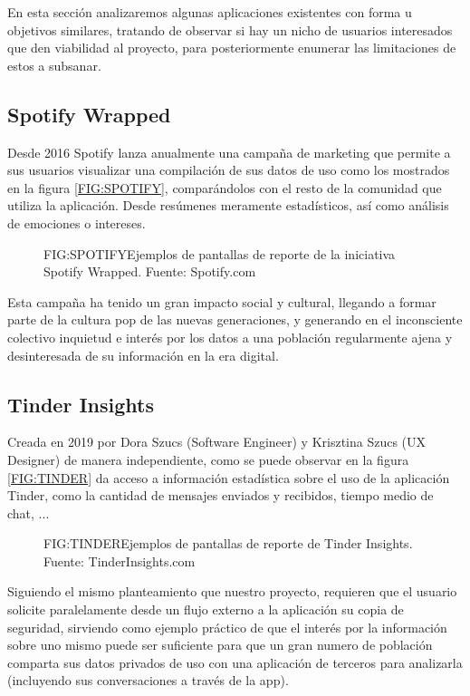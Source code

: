 
En esta sección analizaremos algunas aplicaciones existentes con forma u objetivos similares, tratando de observar si hay un nicho de usuarios interesados que den viabilidad al proyecto, para posteriormente enumerar las limitaciones de estos a subsanar.

\subsection{Spotify Wrapped}

Desde 2016 Spotify lanza anualmente una campaña de marketing\cite{SpotifyWrapped} que permite a sus usuarios visualizar una compilación de sus datos de uso como los mostrados en la figura \ref{FIG:SPOTIFY}, comparándolos con el resto de la comunidad que utiliza la aplicación. Desde resúmenes meramente estadísticos, así como análisis de emociones o intereses.

\begin{figure}[Spotify Wrapped]{FIG:SPOTIFY}{Ejemplos de pantallas de reporte de la iniciativa Spotify Wrapped. Fuente: Spotify.com}
\end{figure}

Esta campaña ha tenido un gran impacto social y cultural, llegando a formar parte de la cultura pop de las nuevas generaciones, y generando en el inconsciente colectivo inquietud e interés por los datos a una población regularmente ajena y desinteresada de su información en la era digital.

\newpage

\subsection{Tinder Insights}

Creada en 2019 por Dora Szucs (Software Engineer) y Krisztina Szucs (UX Designer) de manera independiente\cite{TinderInsigths}, como se puede observar en la figura \ref{FIG:TINDER} da acceso a información estadística sobre el uso de la aplicación Tinder, como la cantidad de mensajes enviados y recibidos, tiempo medio de chat, ...

\begin{figure}[Tinder Insights]{FIG:TINDER}{Ejemplos de pantallas de reporte de Tinder Insights. Fuente: TinderInsights.com}
\end{figure}

Siguiendo el mismo planteamiento que nuestro proyecto, requieren que el usuario solicite paralelamente desde un flujo externo a la aplicación su copia de seguridad, sirviendo como ejemplo práctico de que el interés por la información sobre uno mismo puede ser suficiente para que un gran numero de población comparta sus datos privados de uso con una aplicación de terceros para analizarla (incluyendo sus conversaciones a través de la app).


